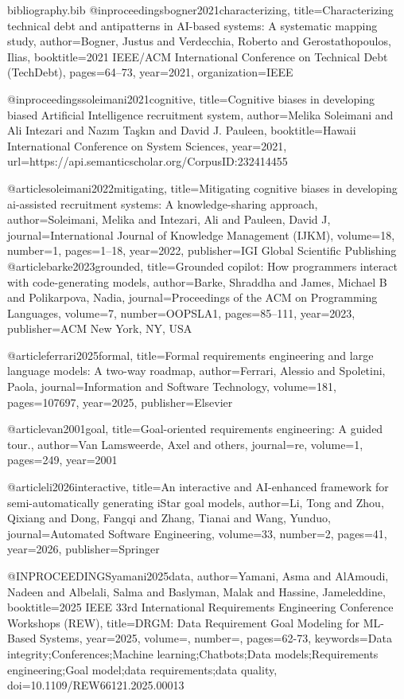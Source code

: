 \begin{filecontents}{bibliography.bib}
@inproceedings{bogner2021characterizing,
  title={Characterizing technical debt and antipatterns in AI-based systems: A systematic mapping study},
  author={Bogner, Justus and Verdecchia, Roberto and Gerostathopoulos, Ilias},
  booktitle={2021 IEEE/ACM International Conference on Technical Debt (TechDebt)},
  pages={64--73},
  year={2021},
  organization={IEEE}
}


@inproceedings{soleimani2021cognitive,
  title={Cognitive biases in developing biased Artificial Intelligence recruitment system},
  author={Melika Soleimani and Ali Intezari and Nazım Taşkın and David J. Pauleen},
  booktitle={Hawaii International Conference on System Sciences},
  year={2021},
  url={https://api.semanticscholar.org/CorpusID:232414455}
}

@article{soleimani2022mitigating,
  title={Mitigating cognitive biases in developing ai-assisted recruitment systems: A knowledge-sharing approach},
  author={Soleimani, Melika and Intezari, Ali and Pauleen, David J},
  journal={International Journal of Knowledge Management (IJKM)},
  volume={18},
  number={1},
  pages={1--18},
  year={2022},
  publisher={IGI Global Scientific Publishing}
}
@article{barke2023grounded,
  title={Grounded copilot: How programmers interact with code-generating models},
  author={Barke, Shraddha and James, Michael B and Polikarpova, Nadia},
  journal={Proceedings of the ACM on Programming Languages},
  volume={7},
  number={OOPSLA1},
  pages={85--111},
  year={2023},
  publisher={ACM New York, NY, USA}
}

@article{ferrari2025formal,
  title={Formal requirements engineering and large language models: A two-way roadmap},
  author={Ferrari, Alessio and Spoletini, Paola},
  journal={Information and Software Technology},
  volume={181},
  pages={107697},
  year={2025},
  publisher={Elsevier}
}

@article{van2001goal,
  title={Goal-oriented requirements engineering: A guided tour.},
  author={Van Lamsweerde, Axel and others},
  journal={re},
  volume={1},
  pages={249},
  year={2001}
}

@article{li2026interactive,
  title={An interactive and AI-enhanced framework for semi-automatically generating iStar goal models},
  author={Li, Tong and Zhou, Qixiang and Dong, Fangqi and Zhang, Tianai and Wang, Yunduo},
  journal={Automated Software Engineering},
  volume={33},
  number={2},
  pages={41},
  year={2026},
  publisher={Springer}
}

@INPROCEEDINGS{yamani2025data,
  author={Yamani, Asma and AlAmoudi, Nadeen and Albelali, Salma and Baslyman, Malak and Hassine, Jameleddine},
  booktitle={2025 IEEE 33rd International Requirements Engineering Conference Workshops (REW)}, 
  title={DRGM: Data Requirement Goal Modeling for ML-Based Systems}, 
  year={2025},
  volume={},
  number={},
  pages={62-73},
  keywords={Data integrity;Conferences;Machine learning;Chatbots;Data models;Requirements engineering;Goal model;data requirements;data quality},
  doi={10.1109/REW66121.2025.00013}}


\end{filecontents}
